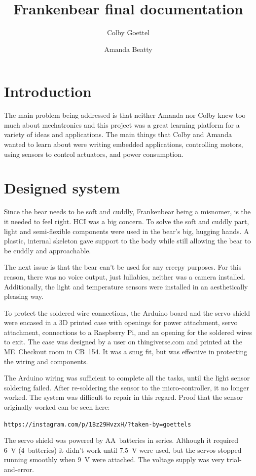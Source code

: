 \documentclass{article}
\title{Frankenbear final documentation}
\author{Colby Goettel\and Amanda Beatty}
\begin{document}
\maketitle

\section{Introduction}
The main problem being addressed is that neither Amanda nor Colby knew too much about mechatronics and this project was a great learning platform for a variety of ideas and applications. The main things that Colby and Amanda wanted to learn about were writing embedded applications, controlling motors, using sensors to control actuators, and power consumption.

\section{Designed system}
Since the bear needs to be soft and cuddly, Frankenbear being a misnomer, is the it needed to feel right. HCI was a big concern. To solve the soft and cuddly part, light and semi-flexible components were used in the bear's big, hugging hands. A plastic, internal skeleton gave support to the body while still allowing the bear to be cuddly and approachable.

The next issue is that the bear can't be used for any creepy purposes. For this reason, there was no voice output, just lullabies, neither was a camera installed. Additionally, the light and temperature sensors were installed in an aesthetically pleasing way.

To protect the soldered wire connections, the Arduino board and the servo shield were encased in a 3D printed case with openings for power attachment, servo attachment, connections to a Raspberry Pi, and an opening for the soldered wires to exit. The case was designed by a user on thingiverse.com and printed at the ME~Checkout room in CB~154. It was a snug fit, but was effective in protecting the wiring and components.

The Arduino wiring was sufficient to complete all the tasks, until the light sensor soldering failed. After re-soldering the sensor to the micro-controller, it no longer worked. The system was difficult to repair in this regard. Proof that the sensor originally worked can be seen here:

\hfil\texttt{https://instagram.com/p/1Bz29HvzxH/?taken-by=goettels}\hfil

The servo shield was powered by AA~batteries in series. Although it required 6~V (4~batteries) it didn't work until 7.5~V were used, but the servos stopped running smoothly when 9~V were attached. The voltage supply was very trial-and-error.
\end{document}
